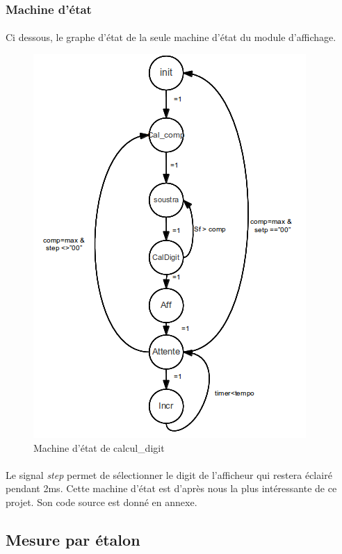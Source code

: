\documentclass[a4paper,11pt]{article}
\begin{document}
  \subsubsection{Machine d'état}
\paragraph{} Ci dessous, le graphe d'état de la seule machine d'état du module d'affichage.
\begin{figure}[H]
\begin{center}
	\includegraphics[scale=.8]{machine_CalDigit.png}
	\caption{Machine d'état de calcul\_digit}
\end{center}
\end{figure}

\paragraph{} Le signal \textit{step} permet de sélectionner le digit de l'afficheur qui restera éclairé pendant 2ms. Cette 
machine d'état est d'après nous la plus intéressante de ce projet. Son code source est donné en annexe.

\subsection{Mesure par étalon}
\end{document}
